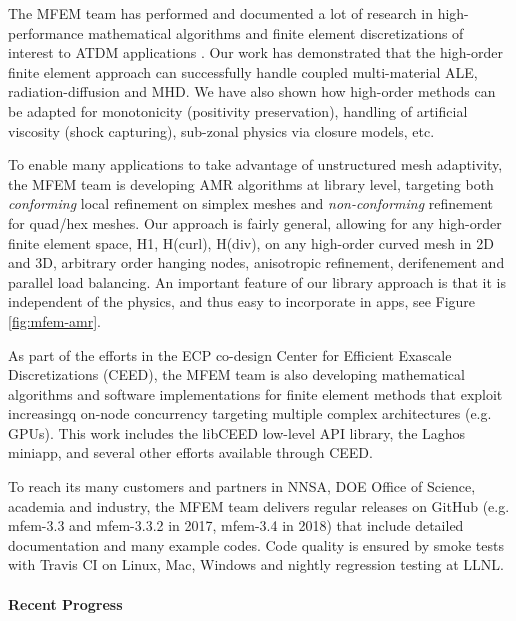 The MFEM team has performed and documented a lot of research in
high-performance mathematical algorithms and finite element discretizations
of interest to ATDM applications
\cite{BLAST18,BLASTFCT18,BLASTFCT17,BLAST16,BLAST14,BLAST13,BLAST12,BLAST11}.
Our work has demonstrated that the high-order finite element approach can
successfully handle coupled multi-material ALE, radiation-diffusion and MHD.
We have also shown how high-order methods can be adapted for monotonicity
(positivity preservation), handling of artificial viscosity (shock capturing),
sub-zonal physics via closure models, etc.

To enable many applications to take advantage of unstructured mesh adaptivity,
the MFEM team is developing AMR algorithms at library level, targeting both
{\em conforming} local refinement on simplex meshes and {\em non-conforming}
refinement for quad/hex meshes. Our approach is fairly general, allowing for
any high-order finite element space, H1, H(curl), H(div), on any high-order
curved mesh in 2D and 3D, arbitrary order hanging nodes, anisotropic refinement,
derifenement and parallel load balancing.
An important feature of our library approach is that it is independent of
the physics, and thus easy to incorporate in apps, see Figure \ref{fig:mfem-amr}.

As part of the efforts in the ECP co-design Center for Efficient Exascale
Discretizations (CEED), the MFEM team is also developing mathematical algorithms
and software implementations for finite element methods that exploit increasingq
on-node concurrency targeting multiple complex architectures (e.g. GPUs). This
work includes the libCEED low-level API library, the Laghos miniapp, and several
other efforts available through CEED.

To reach its many customers and partners in NNSA, DOE Office of Science, academia
and industry, the MFEM team delivers regular releases on GitHub (e.g. mfem-3.3 and
mfem-3.3.2 in 2017, mfem-3.4 in 2018) that include detailed documentation and
many example codes.
Code quality is ensured by smoke tests with Travis CI on Linux, Mac, Windows and
nightly regression testing at LLNL.

\paragraph{Recent Progress}

